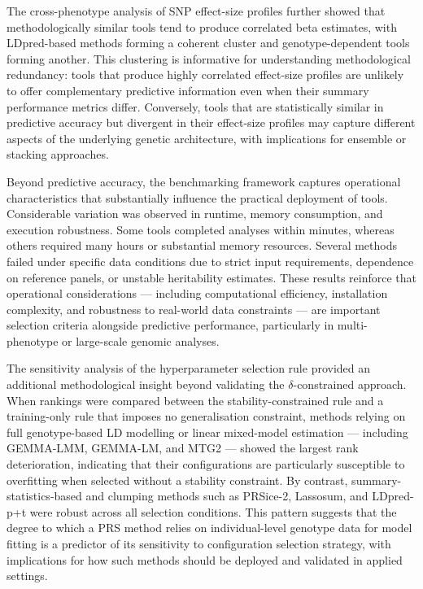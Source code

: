 \documentclass[pdflatex,sn-basic]{sn-jnl}
\begin{document}
The cross-phenotype analysis of SNP effect-size profiles further showed that methodologically similar tools tend to produce correlated beta estimates, with LDpred-based methods forming a coherent cluster and genotype-dependent tools forming another. This clustering is informative for understanding methodological redundancy: tools that produce highly correlated effect-size profiles are unlikely to offer complementary predictive information even when their summary performance metrics differ. Conversely, tools that are statistically similar in predictive accuracy but divergent in their effect-size profiles may capture different aspects of the underlying genetic architecture, with implications for ensemble or stacking approaches.

Beyond predictive accuracy, the benchmarking framework captures operational characteristics that substantially influence the practical deployment of tools. Considerable variation was observed in runtime, memory consumption, and execution robustness. Some tools completed analyses within minutes, whereas others required many hours or substantial memory resources. Several methods failed under specific data conditions due to strict input requirements, dependence on reference panels, or unstable heritability estimates. These results reinforce that operational considerations --- including computational efficiency, installation complexity, and robustness to real-world data constraints --- are important selection criteria alongside predictive performance, particularly in multi-phenotype or large-scale genomic analyses. 

The sensitivity analysis of the hyperparameter selection rule provided an additional methodological insight beyond validating the $\delta$-constrained approach. When rankings were compared between the stability-constrained rule and a training-only rule that imposes no generalisation constraint, methods relying on full genotype-based LD modelling or linear mixed-model estimation --- including GEMMA-LMM, GEMMA-LM, and MTG2 --- showed the largest rank deterioration, indicating that their configurations are particularly susceptible to overfitting when selected without a stability constraint. By contrast, summary-statistics-based and clumping methods such as PRSice-2, Lassosum, and LDpred-p+t were robust across all selection conditions. This pattern suggests that the degree to which a PRS method relies on individual-level genotype data for model fitting is a predictor of its sensitivity to configuration selection strategy, with implications for how such methods should be deployed and validated in applied settings.
\end{document}
